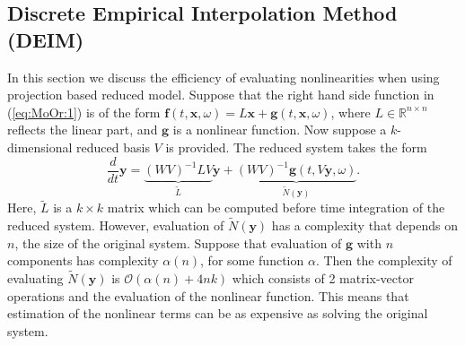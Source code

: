 \subsection{Discrete Empirical Interpolation Method (DEIM)} \label{chap:MoOr.DEIM:1} \nocite{Chaturantabut:2010cz}
In this section we {\edit discuss the efficiency} of evaluating nonlinearities when using projection based reduced model. Suppose that the right hand side function in (\ref{eq:MoOr:1}) is of the form $\mathbf f(t,\mathbf x , \omega) = L\mathbf x + \mathbf g(t,\mathbf x ,\omega)$, where $L\in \mathbb R^{n\times n}$ reflects the linear part, and $\mathbf g$ is a nonlinear function. Now suppose a $k$-dimensional reduced basis $V$ is provided. The reduced system takes the form
\begin{equation} \label{eq:MoOr:8}
	\frac{d}{dt} \mathbf y = \underbrace{(WV)^{-1} L V}_{\tilde L} \mathbf{y} + \underbrace{(WV)^{-1} \mathbf g(t,V\mathbf y,\omega)}_{\tilde N (\mathbf y)}.
\end{equation}
Here, $\tilde L$ is a $k\times k$ matrix which can be computed before time integration of the reduced system. However, evaluation of $\tilde N (\mathbf y)$ has a complexity that depends on $n$, the size of the original system. Suppose that evaluation of $\mathbf g$ with $n$ components has complexity $\alpha(n)$, for some function $\alpha$. Then the complexity of evaluating $\tilde N(\mathbf y)$ is $\mathcal{O}(\alpha(n) + 4nk)$ which consists of 2 matrix-vector operations and the evaluation of the nonlinear function. This means that estimation of the nonlinear terms can be as expensive as solving the original system.

